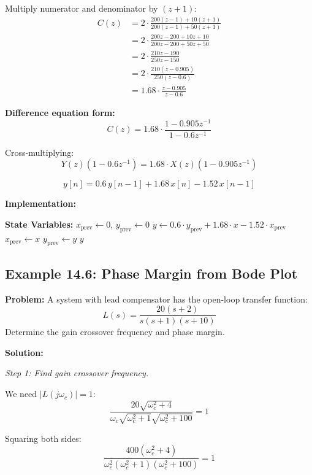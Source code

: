 Multiply numerator and denominator by $(z+1)$:
\begin{align}
C(z) &= 2 \cdot \frac{200(z-1) + 10(z+1)}{200(z-1) + 50(z+1)} \\
&= 2 \cdot \frac{200z - 200 + 10z + 10}{200z - 200 + 50z + 50} \\
&= 2 \cdot \frac{210z - 190}{250z - 150} \\
&= 2 \cdot \frac{210(z - 0.905)}{250(z - 0.6)} \\
&= 1.68 \cdot \frac{z - 0.905}{z - 0.6}
\end{align}

\textbf{Difference equation form:}
\[
C(z) = 1.68 \cdot \frac{1 - 0.905z^{-1}}{1 - 0.6z^{-1}}
\]

Cross-multiplying:
\[
Y(z)(1 - 0.6z^{-1}) = 1.68 \cdot X(z)(1 - 0.905z^{-1})
\]

\[
y[n] = 0.6 \, y[n-1] + 1.68 \, x[n] - 1.52 \, x[n-1]
\]

\textbf{Implementation:}
\begin{algorithm}
\caption{Digital Lead Compensator Difference Equation}
\begin{algorithmic}[1]
\State \textbf{State Variables:} $x_{\text{prev}} \gets 0$, $y_{\text{prev}} \gets 0$
\State
{}
    \State $y \gets 0.6 \cdot y_{\text{prev}} + 1.68 \cdot x - 1.52 \cdot x_{\text{prev}}$
    \State $x_{\text{prev}} \gets x$
    \State $y_{\text{prev}} \gets y$
    \State \Return $y$
\EndFunction
\end{algorithmic}
\end{algorithm}

\subsection{Example 14.6: Phase Margin from Bode Plot}

\textbf{Problem:} A system with lead compensator has the open-loop transfer function:
\[
L(s) = \frac{20(s+2)}{s(s+1)(s+10)}
\]
Determine the gain crossover frequency and phase margin.

\textbf{Solution:}

\textit{Step 1: Find gain crossover frequency.}

We need $|L(j\omega_c)| = 1$:
\[
\frac{20\sqrt{\omega_c^2 + 4}}{\omega_c \sqrt{\omega_c^2 + 1}\sqrt{\omega_c^2 + 100}} = 1
\]

Squaring both sides:
\[
\frac{400(\omega_c^2 + 4)}{\omega_c^2(\omega_c^2 + 1)(\omega_c^2 + 100)} = 1
\]

